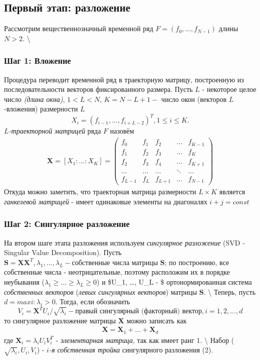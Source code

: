 \documentclass[
]{article}
\begin{document}
\subsection{Первый этап: разложение}

Рассмотрим вещественнозначный временной ряд
\(\textit{F} = (f_0, ..., f_{N-1})\) длины \(N > 2\). \textbackslash{}

\subsubsection{Шаг 1: Вложение}

Процедура переводит временной ряд в траекторную матрицу, построенную из
последовательности векторов фиксированного размера. Пусть \(L\) -
некоторое целое число \textit{(длина окна)}, \(1 < L < N\),
\(K = N - L + 1 -\) число окон (векторов \(L\)-вложения) размерности
\(L\) \[X_i = (f_{i-1},..., f_{i+L-2})^T, 1 \leq i \leq K.\]
\(\textit{L}\)\textit{-траекторной матрицей} ряда \(\textit{F}\) назовём
\begin{align}
\textbf{X} = [X_1:...:X_K] = 
\begin{pmatrix}
    f_0 & f_1 & f_2 & ... & f_{K-1} \\
    f_1 & f_2 & f_3 & ... & f_{K} \\
    f_2 & f_3 & f_4 & ... & f_{K+1} \\
    ... & ... & ... & \ddots & ... \\
    f_{L-1} & f_{L} & f_{L+1} & ... & f_{N-1} 
\end{pmatrix}
\end{align} Откуда можно заметить, что траекторная матрица размерности
\(L \times K\) является \textit{ганкелевой матрицей} - имеет одинаковые
элементы на диагоналях \(i + j = const\)

\newpage

\subsubsection{Шаг 2: Сингулярное разложение}

На втором шаге этапа разложения используем
\textit{сингулярное разложение} (SVD - Singular Value Decomposition).
Пусть
\(\textbf{S} = \textbf{XX}^T, \lambda_1, ..., \lambda_L - \textit{собственные числа матрицы } \textbf{S}\);
по построению, все собственные числа - неотрицательные, поэтому
расположим их в порядке неубывания
(\(\lambda_1 \geq ... \geq \lambda_L \geq 0\)) и \$U\_1, \ldots, U\_L -
\$ ортонормированная система \textit{собственных векторов}
(\textit{левых сингулярных векторов}) матрицы \(\textbf{S}\).
\textbackslash{} Теперь, пусть \(d = max{i: \lambda_i > 0}\). Тогда,
если обозначить
\[V_i = \textbf{X}^TU_i/\sqrt{\lambda_i} - \textit{правый сингулярный (факторный) вектор}, i = 1, 2, ..., d\]
то сингулярное разложение матрицы \(\textbf{X}\) можно записать как
\begin{align}
    \textbf{X} = \textbf{X}_1 + ... + \textbf{X}_d
\end{align} где \(\textbf{X}_i = \lambda_iU_iV_i^T\) -
\textit{элементарная матрица}, так как имеет ранг 1. \textbackslash{}
Набор (\(\sqrt{\lambda_i}, U_i, V_i\)) -
\(i\)\textit{-я собственная тройка} сингулярного разложения (2).
\end{document}
